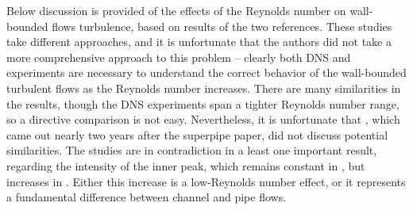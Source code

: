 \documentclass[11pt]{article}
\begin{document}
    Below discussion is provided of the effects of the Reynolds number on wall-bounded flows turbulence,
     based on results of the two references. These studies take different approaches, and it is unfortunate
     that the authors did not take a more comprehensive approach to this problem – clearly both DNS and
     experiments are necessary to understand the correct behavior of the wall-bounded turbulent flows
     as the Reynolds number increases. There are many similarities in the results, though the DNS
     experiments span a tighter Reynolds number range, so a directive comparison is not easy. Nevertheless,
      it is unfortunate that \cite{bernardini_etal2014}, which came out nearly two years after the superpipe      paper, did not discuss potential similarities. The studies are in contradiction in a least one important result, regarding the intensity of the inner peak, which remains constant in \cite{hultmark_etal2012}, but
      increases in \cite{bernardini_etal2014}. Either this increase is a low-Reynolds number effect, or it
      represents a fundamental difference between channel and pipe flows.
\end{document}
